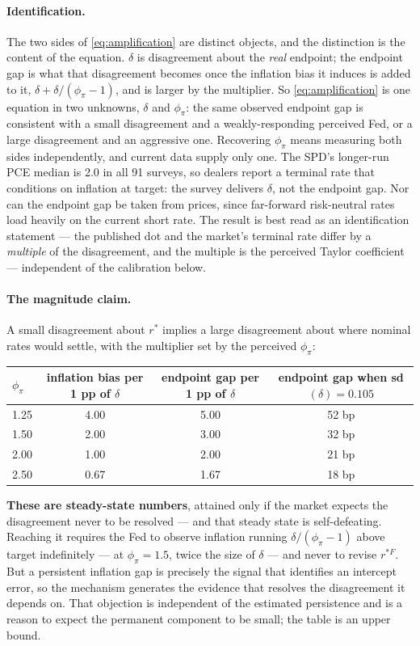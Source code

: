 \documentclass[11pt]{article}
\begin{document}
\paragraph{Identification.} The two sides of \eqref{eq:amplification} are distinct objects, and
the distinction is the content of the equation. $\delta$ is disagreement about the \emph{real}
endpoint; the endpoint gap is what that disagreement becomes once the inflation bias it induces
is added to it, $\delta + \delta/(\phi_\pi-1)$, and is larger by the multiplier. So
\eqref{eq:amplification} is one equation in two unknowns, $\delta$ and $\phi_\pi$: the same
observed endpoint gap is consistent with a small disagreement and a weakly-responding perceived
Fed, or a large disagreement and an aggressive one. Recovering $\phi_\pi$ means measuring both
sides independently, and current data supply only one. The SPD's longer-run PCE median is 2.0 in
all 91 surveys, so dealers report a terminal rate that conditions on inflation at target: the
survey delivers $\delta$, not the endpoint gap. Nor can the endpoint gap be taken from prices,
since far-forward risk-neutral rates load heavily on the current short rate. The result is best
read as an identification statement --- the published dot and the market's terminal rate differ
by a \emph{multiple} of the disagreement, and the multiple is the perceived Taylor
coefficient --- independent of the calibration below.
\paragraph{The magnitude claim.} A small disagreement about $r^{*}$ implies a large disagreement
about where nominal rates would settle, with the multiplier set by the perceived $\phi_\pi$:
\begin{center}\small
\begin{tabular}{lccc}
\toprule
$\phi_\pi$ & inflation bias per 1 pp of $\delta$ & endpoint gap per 1 pp of $\delta$ & endpoint gap when sd$(\delta)=0.105$\\ \midrule
1.25 & 4.00 & 5.00 & 52 bp\\
1.50 & 2.00 & 3.00 & 32 bp\\
2.00 & 1.00 & 2.00 & 21 bp\\
2.50 & 0.67 & 1.67 & 18 bp\\
\bottomrule\end{tabular}
\end{center}
\noindent \textbf{These are steady-state numbers}, attained only if the market expects the
disagreement never to be resolved --- and that steady state is self-defeating. Reaching it
requires the Fed to observe inflation running $\delta/(\phi_\pi-1)$ above target indefinitely
--- at $\phi_\pi=1.5$, twice the size of $\delta$ --- and never to revise $r^{*F}$. But a
persistent inflation gap is precisely the signal that identifies an intercept error, so the
mechanism generates the evidence that resolves the disagreement it depends on. That objection is
independent of the estimated persistence and is a reason to expect the permanent component to be
small; the table is an upper bound.
\end{document}
